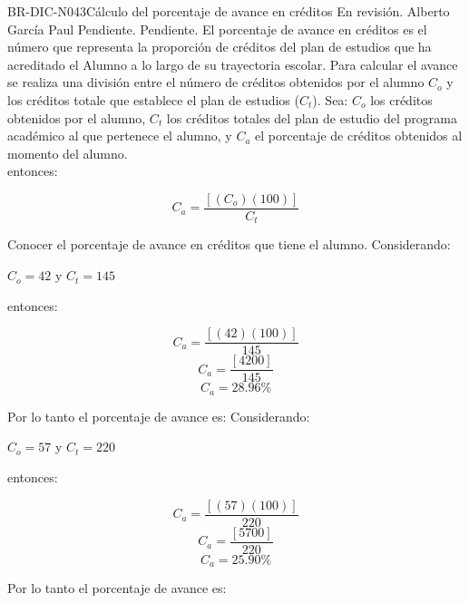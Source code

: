 \begin{BusinessRule}{BR-DIC-N043}{Cálculo del porcentaje de avance en créditos}
	{\bcCondition} %
	{\btTimer}     %
	{\blInfluencing}     %
	\BRItem[Estado] En revisión.
	  Alberto García Paul
	 Pendiente.
	 Pendiente.
	\BRItem[Descripción] El porcentaje de avance en créditos es el número que representa la proporción de créditos del plan de estudios que ha acreditado el Alumno a lo largo de su trayectoria escolar. Para calcular el avance se realiza una división entre el número de créditos obtenidos por el alumno $C_{o}$ y los créditos totale que establece el plan de estudios  ($C_{t}$). 
	\BRItem[Sentencia] \cdtEmpty
	Sea: $C_{o}$ los créditos obtenidos por el alumno, $C_{t}$ los créditos totales del plan de estudio del programa académico al que pertenece el alumno, y $C_{a}$ el porcentaje de créditos obtenidos al momento del alumno. \\
	entonces:
	\begin{center}
		\[C_{a} = \frac{[(C_{o})(100)]}{C_{t}}\]
	\end{center}
	\BRItem[Motivación] Conocer el porcentaje de avance en créditos que tiene el alumno.
	\BRItem[Ejemplo 1] \cdtEmpty
	Considerando: 
	\begin{center}
		$C_{o} = 42$ y $C_{t} = 145$
	\end{center}
	entonces:
	\begin{center}
		\[C_{a} = \frac{[(42)(100)]}{145}\]  
		\[C_{a} = \frac{[4200]}{145}\] 
		\[C_{a} = 28.96 \%\]
	\end{center}
	Por lo tanto el porcentaje de avance es:
	\BRItem[Ejemplo 2]
	Considerando: 
	\begin{center}
		$C_{o} = 57$ y $C_{t} = 220$
	\end{center}
	entonces:
	\begin{center}
		\[C_{a} = \frac{[(57)(100)]}{220}\]  
		\[C_{a} = \frac{[5700]}{220}\]  
		\[C_{a} = 25.90 \%\]
	\end{center} 
	Por lo tanto el porcentaje de avance es:
\end{BusinessRule}

